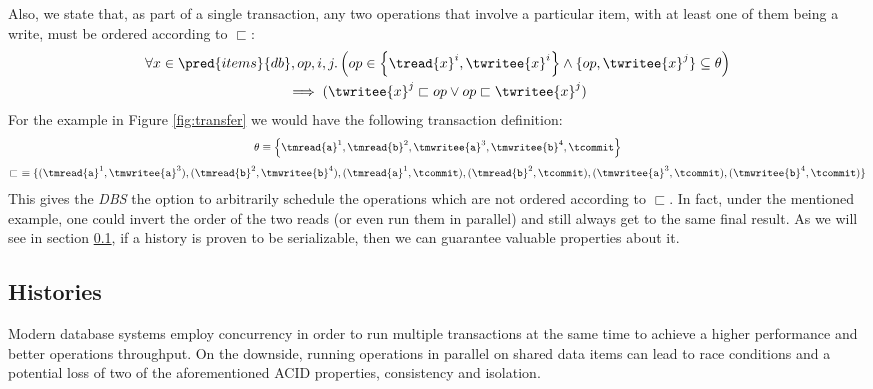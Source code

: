 Also, we state that, as part of a single transaction, any two operations that involve a particular item, with at least one of them being a write, must be ordered according to $\sqsubset$:
\begin{gather*}
	\forall x \in \pred{items}{db}, op, i, j \ldotp \left( op \in \left\lbrace \tread{x}^i, \twritee{x}^i \right\rbrace \land \lbrace op, \twritee{x}^j \rbrace \subseteq \theta \right) \\ \implies (\twritee{x}^j \sqsubset op \lor op \sqsubset \twritee{x}^j)
\end{gather*}
For the example in Figure \ref{fig:transfer} we would have the following transaction definition:
\begin{gather*}
\theta \equiv \left\lbrace \tmread{\texttt{a}}^1, \tmread{\texttt{b}}^2, \tmwritee{\texttt{a}}^3, \tmwritee{\texttt{b}}^4, \tcommit \right\rbrace
\\[0.4em]
\sqsubset\ \equiv \{ (\tmread{\texttt{a}}^1, \tmwritee{\texttt{a}}^3), (\tmread{\texttt{b}}^2, \tmwritee{\texttt{b}}^4), (\tmread{\texttt{a}}^1, \tcommit), (\tmread{\texttt{b}}^2, \tcommit), (\tmwritee{\texttt{a}}^3, \tcommit), (\tmwritee{\texttt{b}}^4, \tcommit) \}
\end{gather*}
This gives the \textit{DBS} the option to arbitrarily schedule the operations which are not ordered according to $\sqsubset$. In fact, under the mentioned example, one could invert the order of the two reads (or even run them in parallel) and still always get to the same final result. As we will see in section \ref{histories}, if a history is proven to be serializable, then we can guarantee valuable properties about it.

\tocless\subsection{Histories} \label{histories}

Modern database systems employ concurrency in order to run multiple transactions at the same time to achieve a higher performance and better operations throughput. On the downside, running operations in parallel on shared data items can lead to race conditions and a potential loss of two of the aforementioned ACID properties, consistency and isolation.


